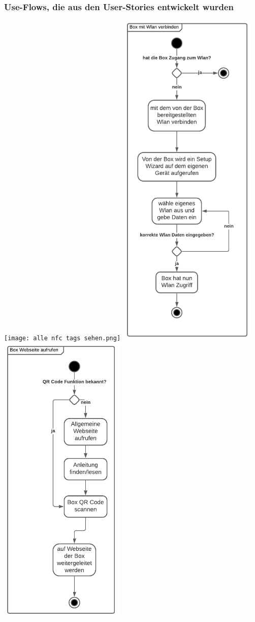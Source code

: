 \documentclass[10pt, a4paper]{article}
\begin{document}
  \subsubsection*{Use-Flows, die aus den User-Stories entwickelt wurden}
  \texttt{[image: alle nfc tags sehen.png]}
  \includegraphics[width=0.5\textwidth]{box mit wlan verbinden.png}
  \newpage
  \includegraphics[width=0.45\textwidth]{box website aufrufen.png}
\end{document}
